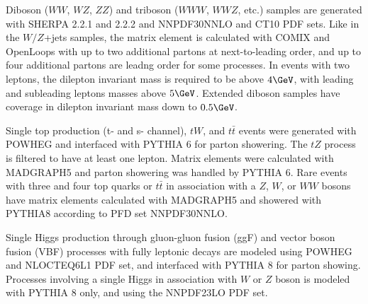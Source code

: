 Diboson ($WW$, $WZ$, $ZZ$) and triboson ($WWW$, $WWZ$, etc.) samples are generated with SHERPA 2.2.1 and 2.2.2 and NNPDF30NNLO and CT10 PDF sets.  Like in the $W/Z$+jets samples, the matrix element is calculated with COMIX and OpenLoops with up to two additional partons at next-to-leading order, and up to four additional partons are leadng order for some processes.  In events with two leptons, the dilepton invariant mass is required to be above $4\GeV$, with leading and subleading leptons masses above $5\GeV$.  Extended diboson samples have coverage in dilepton invariant mass down to $0.5\GeV$.    
 
 Single top production (t- and s- channel), $tW$, and $t\bar{t}$ events were generated with POWHEG and interfaced with PYTHIA 6 for parton showering.  The $tZ$ process is filtered to have at least one lepton.  Matrix elements were calculated with MADGRAPH5 and parton showering was handled by PYTHIA 6.  Rare events with three and four top quarks or $t\bar{t}$ in association with a $Z$, $W$, or $WW$ bosons have matrix elements calculated with MADGRAPH5 and showered with PYTHIA8 according to PFD set NNPDF30NNLO.
 
Single Higgs production through gluon-gluon fusion (ggF) and vector boson fusion (VBF) processes with fully leptonic decays are modeled using POWHEG and NLOCTEQ6L1 PDF set, and interfaced with PYTHIA 8 for parton showing.  Processes involving a single Higgs in association with $W$ or $Z$ boson is modeled with PYTHIA 8 only, and using the NNPDF23LO PDF set.
 
 \iffalse
 \section{Derivation}
Describe details of the SUSY16 derivation used to select events from data

\fi 

 

